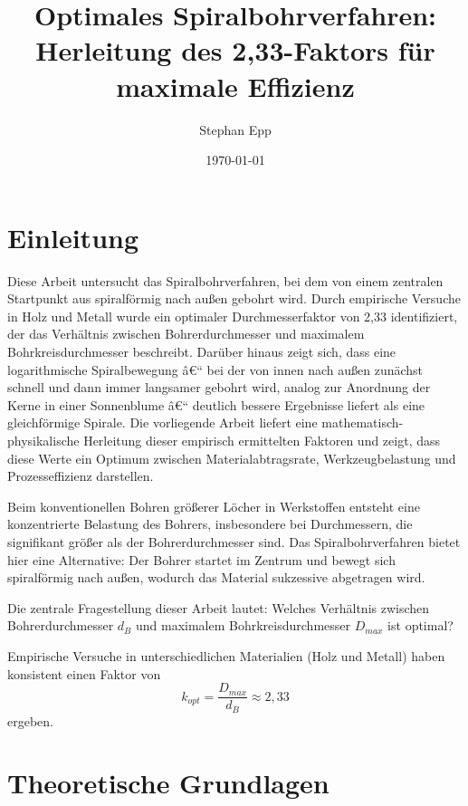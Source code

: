 ﻿\documentclass[12pt,a4paper]{article}
\title{Optimales Spiralbohrverfahren:\\Herleitung des 2,33-Faktors für maximale Effizienz}
\author{Stephan Epp}
\date{\today}
\begin{document}
\renewcommand{\labelitemi}{--}
\renewcommand{\labelitemii}{--}
\renewcommand{\labelitemiii}{--}

	
\maketitle

\tableofcontents

\newpage

\section{Einleitung}
Diese Arbeit untersucht das Spiralbohrverfahren, bei dem von einem zentralen Startpunkt aus spiralförmig nach außen gebohrt wird. Durch empirische Versuche in Holz und Metall wurde ein optimaler Durchmesserfaktor von 2,33 identifiziert, der das Verhältnis zwischen Bohrerdurchmesser und maximalem Bohrkreisdurchmesser beschreibt. Darüber hinaus zeigt sich, dass eine logarithmische Spiralbewegung â€“ bei der von innen nach außen zunächst schnell und dann immer langsamer gebohrt wird, analog zur Anordnung der Kerne in einer Sonnenblume â€“ deutlich bessere Ergebnisse liefert als eine gleichförmige Spirale. Die vorliegende Arbeit liefert eine mathematisch-physikalische Herleitung dieser empirisch ermittelten Faktoren und zeigt, dass diese Werte ein Optimum zwischen Materialabtragsrate, Werkzeugbelastung und Prozesseffizienz darstellen.
	
Beim konventionellen Bohren größerer Löcher in Werkstoffen entsteht eine konzentrierte Belastung des Bohrers, insbesondere bei Durchmessern, die signifikant größer als der Bohrerdurchmesser sind. Das Spiralbohrverfahren bietet hier eine Alternative: Der Bohrer startet im Zentrum und bewegt sich spiralförmig nach außen, wodurch das Material sukzessive abgetragen wird.

Die zentrale Fragestellung dieser Arbeit lautet: Welches Verhältnis zwischen Bohrerdurchmesser $d_B$ und maximalem Bohrkreisdurchmesser $D_{max}$ ist optimal?

Empirische Versuche in unterschiedlichen Materialien (Holz und Metall) haben konsistent einen Faktor von
\begin{equation}
	k_{opt} = \frac{D_{max}}{d_B} \approx 2{,}33
\end{equation}
ergeben.

\section{Theoretische Grundlagen}
\end{document}
